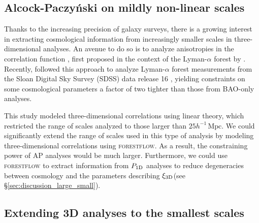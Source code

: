 \documentclass{aa}
\newcommand{\lyaf}{Lyman-$\alpha$ forest\xspace}
\newcommand{\poned}{\ensuremath{P_{\rm 1D}}\xspace}
\newcommand{\xithreed}{\ensuremath{\xi_{\rm 3D}}\xspace}
\newcommand{\forestflow}{\textsc{forestflow}\xspace}
\newcommand{\hMpc}{h^{-1}\,\mathrm{Mpc}}
\begin{document}
\subsection{Alcock-Paczy\'nski on mildly non-linear scales}

Thanks to the increasing precision of galaxy surveys, there is a growing interest in extracting cosmological information from increasingly smaller scales in three-dimensional analyses. An avenue to do so is to analyze anisotropies in the correlation function \citet[AP test;][]{alcock1979EvolutionFreeTesta}, first proposed in the context of the \lyaf by \citet{1999ApJ...518...24M, hui1999GeometricalTestCosmological}. Recently, \cite{cuceu2023ConstraintsCosmicExpansion} followed this approach to analyze \lyaf measurements from the Sloan Digital Sky Survey (SDSS) data release 16 \citep[DR16;][]{Ahumada2020_DR16}, yielding constraints on some cosmological parameters a factor of two tighter than those from BAO-only analyses. 

This study modeled three-dimensional correlations using linear theory, which restricted the range of scales analyzed to those larger than $25 \hMpc$. We could significantly extend the range of scales used in this type of analysis by modeling three-dimensional correlations using \forestflow. As a result, the constraining power of AP analyses would be much larger. Furthermore, we could use \forestflow to extract information from \poned analyses to reduce degeneracies between cosmology and the parameters describing \xithreed (see \S\ref{sec:discussion_large_small}).


\subsection{Extending 3D analyses to the smallest scales}
\end{document}
